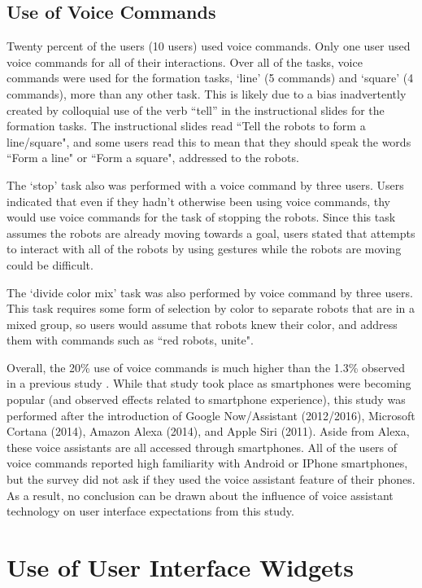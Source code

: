 \subsection{Use of Voice Commands}

Twenty percent of the users (10 users) used voice commands. 
Only one user used voice commands for all of their interactions. 
Over all of the tasks, voice commands were used for the formation tasks, `line' (5 commands) and `square' (4 commands), more than any other task. 
This is likely due to a bias inadvertently created by colloquial use of the verb ``tell'' in the instructional slides for the formation tasks.  
The instructional slides read ``Tell the robots to form a line/square", and some users read this to mean that they should speak the words ``Form a line" or ``Form a square", addressed to the robots.

The `stop' task also was performed with a voice command by three users. 
Users indicated that even if they hadn't otherwise been using voice commands, thy would use voice commands for the task of stopping the robots. 
Since this task assumes the robots are already moving towards a goal, users stated that attempts to interact with all of the robots by using gestures while the robots are moving could be difficult. 

The `divide color mix' task was also performed by voice command by three users. 
This task requires some form of selection by color to separate robots that are in a mixed group, so users would assume that robots knew their color, and address them with commands such as ``red robots, unite".

Overall, the 20\% use of voice commands is much higher than the 1.3\% observed in a previous study \citep{micire2010multi}. 
While that study took place as smartphones were becoming popular (and observed effects related to smartphone experience), this study was performed after the introduction of Google Now/Assistant (2012/2016), Microsoft Cortana (2014), Amazon Alexa (2014), and Apple Siri (2011). 
Aside from Alexa, these voice assistants are all accessed through smartphones.  
All of the users of voice commands reported high familiarity with Android or IPhone smartphones, but the survey did not ask if they used the voice assistant feature of their phones. 
As a result, no conclusion can be drawn about the influence of voice assistant technology on user interface expectations from this study. 

\section{Use of User Interface Widgets}

